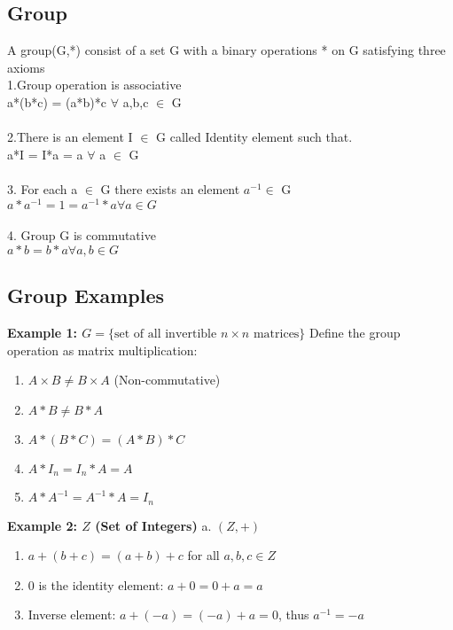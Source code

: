 \documentclass[11pt]{article}
\begin{document}
\subsection*{Group}
A group(G,*) consist of a set G with a binary operations * on G satisfying three axioms \\
1.Group operation is associative\\
a*(b*c) = (a*b)*c \(\forall\) a,b,c \(\in\) G\\
\\
2.There is an element I \(\in\) G  called Identity element such that.\\
    a*I = I*a = a \(\forall\) a \(\in\) G\\
    \\
3. For each a \(\in\) G there exists an element \(a^{-1}\in\) G\\
   \( a*a^{-1} = 1 = a^{-1}*a    \forall a \in G\)\\
   \\
4. Group G is commutative\\
   \( a*b = b*a \forall a,b \in G\)
   



\subsection*{Group Examples}

\textbf{Example 1: \(G = \{\text{set of all invertible } n \times n \text{ matrices}\}\)}
Define the group operation as matrix multiplication:
\begin{enumerate}
    \item \(A \times B \neq B \times A\) (Non-commutative)
    \item \(A \ast B \neq B \ast A\)
    \item \(A \ast (B \ast C) = (A \ast B) \ast C\)
    \item \(A \ast I_n = I_n \ast A = A\)
    \item \(A \ast A^{-1} = A^{-1} \ast A = I_n\)
\end{enumerate}
\textbf{Example 2: \(Z\) (Set of Integers)}
a. \((Z, +)\)
\begin{enumerate}
    \item \(a + (b + c) = (a + b) + c\) for all \(a, b, c \in Z\)
    \item \(0\) is the identity element: \(a + 0 = 0 + a = a\)
    \item Inverse element: \(a + (-a) = (-a) + a = 0\), thus \(a^{-1} = -a\)
\end{enumerate}
\end{document}

